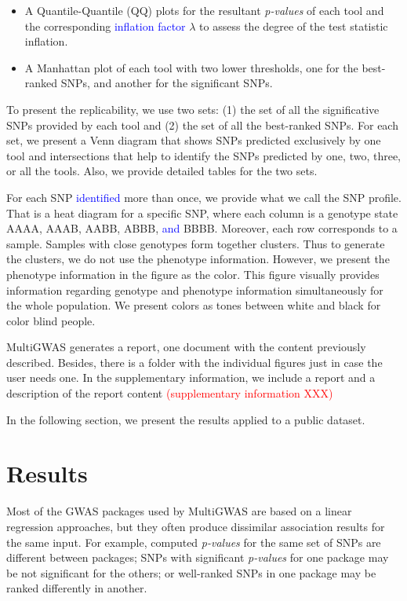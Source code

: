 \documentclass{article}
\begin{document}
\begin{itemize}
\item A Quantile-Quantile (QQ) plots for the resultant \emph{p-values} of each tool and the corresponding \textcolor{blue}{inflation factor} $\lambda$ to assess the degree of the test statistic inflation. 
\item A Manhattan plot of each tool with two lower thresholds, one for the best-ranked SNPs, and another for the significant SNPs. 
\end{itemize}
To present the replicability, we use two sets: (1) the set of all the significative SNPs provided by each tool and (2) the set of all the best-ranked SNPs. For each set, we present a Venn diagram that shows SNPs predicted exclusively by one tool and intersections that help to identify the SNPs predicted by one, two, three, or all the tools. Also, we provide detailed tables for the two sets.

For each SNP \textcolor{blue}{identified} more than once, we provide what we call the SNP profile. That is a heat diagram for a specific SNP, where each column is a genotype state AAAA, AAAB, AABB, ABBB, \textcolor{blue}{and} BBBB. Moreover, each row corresponds to a sample. Samples with close genotypes form together clusters. Thus to generate the clusters, we do not use the phenotype information. However, we present the phenotype information in the figure as the color. This figure visually provides information regarding genotype and phenotype information simultaneously for the whole population. We present colors as tones between white and black for color blind people.

MultiGWAS generates a report, one document with the content previously described. Besides, there is a folder with the individual figures just in case the user needs one. In the supplementary information, we include a report and a description of the report content\textcolor{red}{{} (supplementary information XXX)}


In the following section, we present the results applied to a public dataset. 

\section{Results}

Most of the GWAS packages used by MultiGWAS are based on a linear
regression approaches, but they often produce dissimilar association
results for the same input. For example, computed \emph{p-values }for
the same set of SNPs are different between packages; SNPs with significant
\emph{p-values} for one package may be not significant for the others;
or well-ranked SNPs in one package may be ranked differently in another. 
\end{document}
